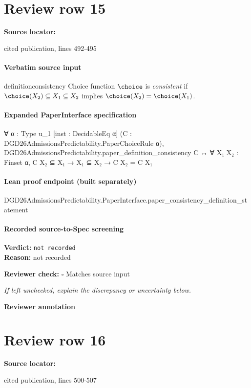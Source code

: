 \documentclass[10pt]{article}
\newcommand{\reviewerbox}{%
  \par\noindent\fbox{\parbox{0.96\linewidth}{\rule{0pt}{0.38in}}}\par
}
\newcommand{\reviewmatch}[1]{%
  \par\noindent\textbf{Reviewer check:} $\square$\; #1\par
  \noindent\emph{If left unchecked, explain the discrepancy or uncertainty below.}\par
}
\begin{document}
\section*{Review row 15}
\textbf{Source locator:} {\footnotesize\raggedright cited publication, lines 492-\allowbreak{}495\par}
\paragraph{Verbatim source input}
\begin{ReviewVerbatim}
\begin{restatable}[Consistency]{definition}{consistency}
\label{def:consistency}
Choice function $\choice$ is \textit{consistent} if $\choice(X_2) \subseteq X_1 \subseteq X_2$ implies $\choice(X_2) = \choice(X_1)$.
\end{restatable}
\end{ReviewVerbatim}


\paragraph{Expanded PaperInterface specification}
\begin{ReviewVerbatim}
∀ {α : Type u_1} [inst : DecidableEq α] (C : DGD26AdmissionsPredictability.PaperChoiceRule α),
  DGD26AdmissionsPredictability.paper_definition_consistency C ↔ ∀ {X₁ X₂ : Finset α}, C X₂ ⊆ X₁ → X₁ ⊆ X₂ → C X₂ = C X₁
\end{ReviewVerbatim}

\paragraph{Lean proof endpoint (built separately)}\begin{ReviewVerbatim}
DGD26AdmissionsPredictability.PaperInterface.paper_consistency_definition_statement
\end{ReviewVerbatim}

\paragraph{Recorded source-to-Spec screening}
\textbf{Verdict:} \texttt{not recorded}
\\
\textbf{Reason:} not recorded
\reviewmatch{Matches source input}
\noindent\textbf{Reviewer annotation}\par
\reviewerbox
\clearpage
\hypertarget{source-claim-ca1d4873227a50e3}{}
\section*{Review row 16}
\textbf{Source locator:} {\footnotesize\raggedright cited publication, lines 500-\allowbreak{}507\par}
\end{document}
